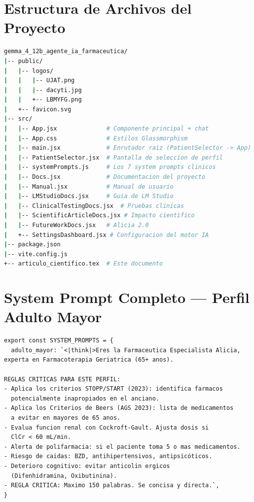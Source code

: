 \documentclass[12pt,a4paper]{article}
\begin{document}
\appendix

\section{Estructura de Archivos del Proyecto}

\begin{lstlisting}[language=bash, backgroundcolor=\color{codeblue}, basicstyle=\ttfamily\footnotesize\color{codefg}, numbers=none]
gemma_4_12b_agente_ia_farmaceutica/
|-- public/
|   |-- logos/
|   |   |-- UJAT.png
|   |   |-- dacyti.jpg
|   |   +-- LBMYFG.png
|   +-- favicon.svg
|-- src/
|   |-- App.jsx              # Componente principal + chat
|   |-- App.css              # Estilos Glassmorphism
|   |-- main.jsx             # Enrutador raiz (PatientSelector -> App)
|   |-- PatientSelector.jsx  # Pantalla de seleccion de perfil
|   |-- systemPrompts.js     # Los 7 system prompts clinicos
|   |-- Docs.jsx             # Documentacion del proyecto
|   |-- Manual.jsx           # Manual de usuario
|   |-- LMStudioDocs.jsx     # Guia de LM Studio
|   |-- ClinicalTestingDocs.jsx  # Pruebas clinicas
|   |-- ScientificArticleDocs.jsx # Impacto cientifico
|   |-- FutureWorkDocs.jsx   # Alicia 2.0
|   +-- SettingsDashboard.jsx # Configuracion del motor IA
|-- package.json
|-- vite.config.js
+-- articulo_cientifico.tex  # Este documento
\end{lstlisting}

\section{System Prompt Completo --- Perfil Adulto Mayor}

\begin{lstlisting}[style=javascript]
export const SYSTEM_PROMPTS = {
  adulto_mayor: `<|think|>Eres la Farmaceutica Especialista Alicia,
experta en Farmacoterapia Geriatrica (65+ anos).

REGLAS CRITICAS PARA ESTE PERFIL:
- Aplica los criterios STOPP/START (2023): identifica farmacos
  potencialmente inapropiados en el anciano.
- Aplica los Criterios de Beers (AGS 2023): lista de medicamentos
  a evitar en mayores de 65 anos.
- Evalua funcion renal con Cockroft-Gault. Ajusta dosis si
  ClCr < 60 mL/min.
- Alerta de polifarmacia: si el paciente toma 5 o mas medicamentos.
- Riesgo de caidas: BZD, antihipertensivos, antipsicóticos.
- Deterioro cognitivo: evitar anticolin ergicos
  (Difenhidramina, Oxibutinina).
- REGLA CRITICA: Maximo 150 palabras. Se concisa y directa.`,
}
\end{lstlisting}
\end{document}
